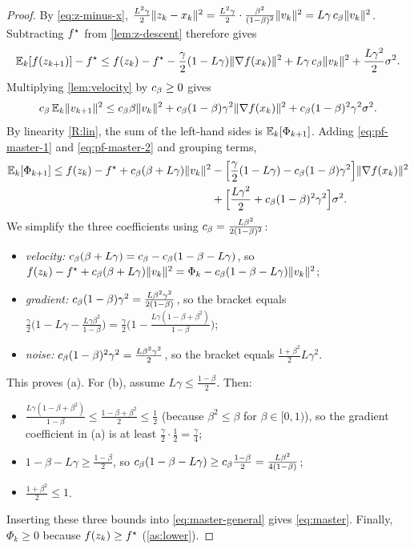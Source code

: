 \begin{proof}
By \eqref{eq:z-minus-x},
$\frac{L^2\gamma}{2}\lVert z_k-x_k\rVert^2=\frac{L^2\gamma}{2}\cdot\frac{\beta^2}{(1-\beta)^2}\lVert v_k\rVert^2
=L\gamma\,c_\beta\lVert v_k\rVert^2$. Subtracting $f^\star$ from \cref{lem:z-descent} therefore gives
\begin{equation}\label{eq:pf-master-1}
  \mathbb{E}_k[f(z_{k+1})]-f^\star\le f(z_k)-f^\star-\frac\gamma2(1-L\gamma)\lVert \nabla f(x_k)\rVert^2
  +L\gamma\,c_\beta\lVert v_k\rVert^2+\frac{L\gamma^2}{2}\sigma^2 .
\end{equation}
Multiplying \cref{lem:velocity} by $c_\beta\ge0$ gives
\begin{equation}\label{eq:pf-master-2}
  c_\beta\,\mathbb{E}_k\lVert v_{k+1}\rVert^2\le c_\beta\beta\lVert v_k\rVert^2+c_\beta(1-\beta)\gamma^2\lVert \nabla f(x_k)\rVert^2
  +c_\beta(1-\beta)^2\gamma^2\sigma^2 .
\end{equation}
By linearity \ref{R:lin}, the sum of the left-hand sides is $\mathbb{E}_k[\Phi_{k+1}]$. Adding
\eqref{eq:pf-master-1} and \eqref{eq:pf-master-2} and grouping terms,
\begin{align*}
  \mathbb{E}_k[\Phi_{k+1}]\le f(z_k)-f^\star+c_\beta(\beta+L\gamma)\lVert v_k\rVert^2
  &-\Bigl[\frac\gamma2(1-L\gamma)-c_\beta(1-\beta)\gamma^2\Bigr]\lVert \nabla f(x_k)\rVert^2\\
  &+\Bigl[\frac{L\gamma^2}{2}+c_\beta(1-\beta)^2\gamma^2\Bigr]\sigma^2 .
\end{align*}
We simplify the three coefficients using $c_\beta=\frac{L\beta^2}{2(1-\beta)^2}$:
\begin{itemize}
\item \emph{velocity:} $c_\beta(\beta+L\gamma)=c_\beta-c_\beta(1-\beta-L\gamma)$, so
  $f(z_k)-f^\star+c_\beta(\beta+L\gamma)\lVert v_k\rVert^2=\Phi_k-c_\beta(1-\beta-L\gamma)\lVert v_k\rVert^2$;
\item \emph{gradient:} $c_\beta(1-\beta)\gamma^2=\frac{L\beta^2\gamma^2}{2(1-\beta)}$, so the bracket equals
  $\frac\gamma2\bigl(1-L\gamma-\frac{L\gamma\beta^2}{1-\beta}\bigr)
  =\frac\gamma2\bigl(1-\frac{L\gamma(1-\beta+\beta^2)}{1-\beta}\bigr)$;
\item \emph{noise:} $c_\beta(1-\beta)^2\gamma^2=\frac{L\beta^2\gamma^2}{2}$, so the bracket equals
  $\frac{1+\beta^2}{2}L\gamma^2$.
\end{itemize}
This proves (a). For (b), assume $L\gamma\le\frac{1-\beta}{2}$. Then:
\begin{itemize}
\item $\frac{L\gamma(1-\beta+\beta^2)}{1-\beta}\le\frac{1-\beta+\beta^2}{2}\le\frac12$
  (because $\beta^2\le\beta$ for $\beta\in[0,1)$), so the gradient coefficient in (a) is at
  least $\frac\gamma2\cdot\frac12=\frac\gamma4$;
\item $1-\beta-L\gamma\ge\frac{1-\beta}2$, so
  $c_\beta(1-\beta-L\gamma)\ge c_\beta\frac{1-\beta}{2}=\frac{L\beta^2}{4(1-\beta)}$;
\item $\frac{1+\beta^2}{2}\le1$.
\end{itemize}
Inserting these three bounds into \eqref{eq:master-general} gives \eqref{eq:master}.
Finally, $\Phi_k\ge0$ because $f(z_k)\ge f^\star$ (\cref{as:lower}).
\end{proof}

